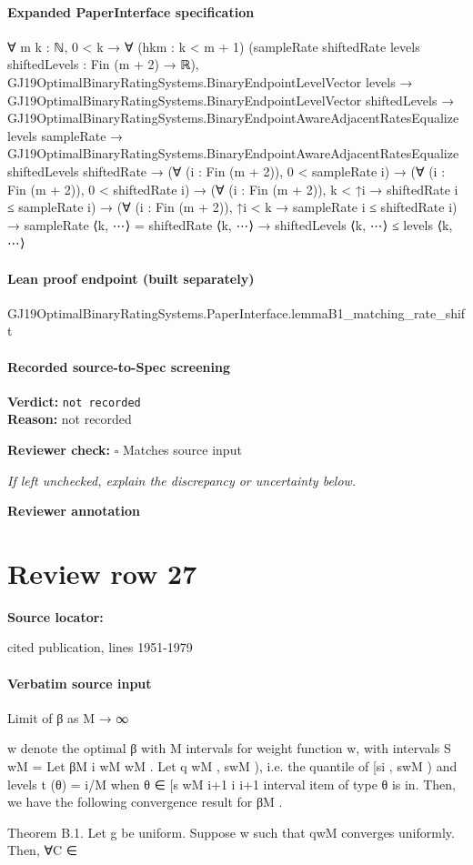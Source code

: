 \documentclass[10pt]{article}
\newcommand{\reviewerbox}{%
  \par\noindent\fbox{\parbox{0.96\linewidth}{\rule{0pt}{0.38in}}}\par
}
\newcommand{\reviewmatch}[1]{%
  \par\noindent\textbf{Reviewer check:} $\square$\; #1\par
  \noindent\emph{If left unchecked, explain the discrepancy or uncertainty below.}\par
}
\begin{document}
\paragraph{Expanded PaperInterface specification}
\begin{ReviewVerbatim}
∀ {m k : ℕ},
  0 < k →
    ∀ (hkm : k < m + 1) (sampleRate shiftedRate levels shiftedLevels : Fin (m + 2) → ℝ),
      GJ19OptimalBinaryRatingSystems.BinaryEndpointLevelVector levels →
        GJ19OptimalBinaryRatingSystems.BinaryEndpointLevelVector shiftedLevels →
          GJ19OptimalBinaryRatingSystems.BinaryEndpointAwareAdjacentRatesEqualize levels sampleRate →
            GJ19OptimalBinaryRatingSystems.BinaryEndpointAwareAdjacentRatesEqualize shiftedLevels shiftedRate →
              (∀ (i : Fin (m + 2)), 0 < sampleRate i) →
                (∀ (i : Fin (m + 2)), 0 < shiftedRate i) →
                  (∀ (i : Fin (m + 2)), k < ↑i → shiftedRate i ≤ sampleRate i) →
                    (∀ (i : Fin (m + 2)), ↑i < k → sampleRate i ≤ shiftedRate i) →
                      sampleRate ⟨k, ⋯⟩ = shiftedRate ⟨k, ⋯⟩ → shiftedLevels ⟨k, ⋯⟩ ≤ levels ⟨k, ⋯⟩
\end{ReviewVerbatim}

\paragraph{Lean proof endpoint (built separately)}\begin{ReviewVerbatim}
GJ19OptimalBinaryRatingSystems.PaperInterface.lemmaB1_matching_rate_shift
\end{ReviewVerbatim}

\paragraph{Recorded source-to-Spec screening}
\textbf{Verdict:} \texttt{not recorded}
\\
\textbf{Reason:} not recorded
\reviewmatch{Matches source input}
\noindent\textbf{Reviewer annotation}\par
\reviewerbox
\clearpage
\hypertarget{source-claim-f84fba16d2553222}{}
\section*{Review row 27}
\textbf{Source locator:} {\footnotesize\raggedright cited publication, lines 1951-\allowbreak{}1979\par}
\paragraph{Verbatim source input}
\begin{ReviewVerbatim}
Limit of β as M → ∞

w denote the optimal β with M intervals for weight function w, with intervals {S wM } =
Let βM
i
wM
wM . Let q
wM , swM ), i.e. the quantile of
{[si , swM
)}
and
levels
t
(θ)
=
i/M
when
θ
∈
[s
wM
i+1
i
i+1
interval item of type θ is in.
Then, we have the following convergence result for βM .

Theorem B.1. Let g be uniform. Suppose w such that qwM converges uniformly. Then, ∀C ∈
\end{ReviewVerbatim}
\end{document}
